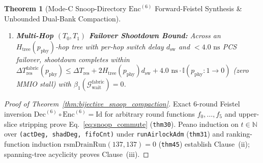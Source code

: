 \documentclass[11pt,letterpaper]{article}
\theoremstyle{spectralthm}
\newtheorem{theorem}{Theorem}[section]
\begin{document}
\begin{theorem}[Mode-C Snoop-Directory $\mathrm{Enc}^{(6)}$ Forward-Feistel Synthesis \& Unbounded Dual-Bank Compaction]
\begin{enumerate}
  \item[(iii)] \textbf{Multi-Hop $(T_0, T_1)$ Failover Shootdown Bound:} Across an $H_{\mathrm{tree}}(p_{\mathrm{phy}})$-hop tree with per-hop switch delay $d_{\mathrm{sw}}$ and $<4.0\text{~ns}$ PCS failover, shootdown completes within $\Delta T_{\mathrm{res}}^{\mathrm{fabric}}(p_{\mathrm{phy}}) \le \Delta T_{\mathrm{res}} + 2 H_{\mathrm{tree}}(p_{\mathrm{phy}}) d_{\mathrm{sw}} + 4.0\text{~ns}\cdot\mathbb{I}(p_{\mathrm{phy}}:1\to 0)$ (zero MMIO stall) with $\beta_1(\mathcal{G}_{\mathrm{wait}}^{\mathrm{fabric}}) = 0$.
\end{enumerate}
\end{theorem}
\begin{proof}[Proof of Theorem~\ref{thm:bijective_snoop_compaction}]
Exact 6-round Feistel inversion $\mathrm{Dec}^{(6)} \circ \mathrm{Enc}^{(6)} = \mathrm{Id}$ for arbitrary round functions $f_0,\ldots,f_5$ and upper-slice stripping prove Eq.~\eqref{eq:snoop_commute} (\texttt{thm30}). Peano induction on $t \in \mathbb{N}$ over \texttt{(actDeg, shadDeg, fifoCnt)} under \texttt{runAirlockAdm} (\texttt{thm31}) and ranking-function induction $\mathrm{rsmDrainRun}(137,137) = 0$ (\texttt{thm45}) establish Clause~(ii); spanning-tree acyclicity proves Clause~(iii).
\end{proof}
\end{document}
